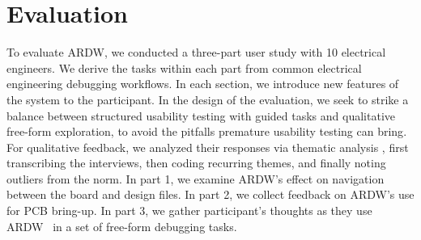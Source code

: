 \documentclass [11pt, proquest] {uwthesis}[2020/02/24]
\newcommand{\ARDWname}{ARDW}
\begin{document}
\section{Evaluation}
\label{sec:study}

To evaluate \ARDWname, we conducted a three-part user study with 10 electrical engineers. We derive the tasks within each part from common electrical engineering debugging workflows. In each section, we introduce new features of the system to the participant. In the design of the evaluation, we seek to strike a balance between structured usability testing with guided tasks and qualitative free-form exploration, to avoid the pitfalls premature usability testing can bring\cite{Greenberg2008UsabilityTime}. For qualitative feedback,
we analyzed their responses via thematic analysis \cite{Braun2006UsingPsychology}, first transcribing the interviews, then coding recurring themes, and finally noting outliers from the norm.
In part 1, we examine \ARDWname's effect on navigation between the board and design files. In part 2, we collect feedback on \ARDWname's use for PCB bring-up. In part 3, we gather participant's thoughts as they use \ARDWname~ in a set of free-form debugging tasks.

\end{document}
